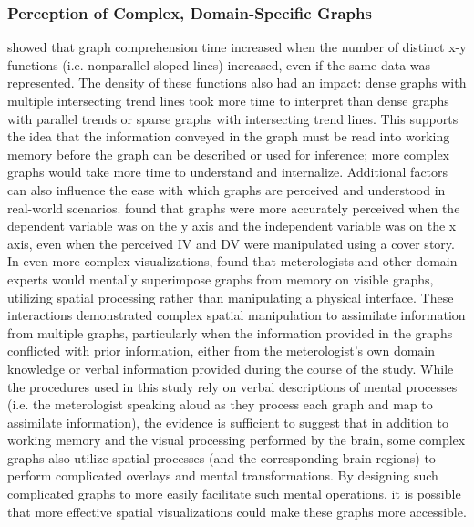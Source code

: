 \documentclass[11pt]{isuthesis}\usepackage[]{graphicx}\usepackage[]{color}
\begin{document}
\subsubsection{Perception of Complex, Domain-Specific Graphs}
\citet{carpenter1998model} showed that graph comprehension time increased when the number of distinct x-y  functions (i.e.  nonparallel sloped lines) increased, even if the same data was represented. The density of these functions also had an impact: dense graphs with multiple intersecting trend lines took more time to interpret than dense graphs with parallel trends or sparse graphs with intersecting trend lines. This supports the idea that the information conveyed in the graph must be read into working memory before the graph can be described or used for inference; more complex graphs would take more time to understand and internalize. Additional factors can also influence the ease with which graphs are perceived and understood in real-world scenarios. \citet{gattis1996mapping} found that graphs were more accurately perceived when the dependent variable was on the y axis and the independent variable was on the x axis, even when the perceived IV and DV were manipulated using a cover story. In even more complex visualizations, \citet{trickett2006toward} found that meterologists and other domain experts would mentally superimpose graphs from memory on visible graphs, utilizing spatial processing rather than manipulating a physical interface. These interactions demonstrated complex spatial manipulation to assimilate information from multiple graphs, particularly when the information provided in the graphs conflicted with prior information, either from the meterologist's own domain knowledge or verbal information provided during the course of the study. While the procedures used in this study rely on verbal descriptions of mental processes (i.e. the meterologist speaking aloud as they process each graph and map to assimilate information), the evidence is sufficient to suggest that in addition to working memory and the visual processing performed by the brain, some complex graphs also utilize spatial processes (and the corresponding brain regions) to perform complicated overlays and mental transformations. By designing such complicated graphs to more easily facilitate such mental operations, it is possible that more effective spatial visualizations could make these graphs more accessible. 
\end{document}
